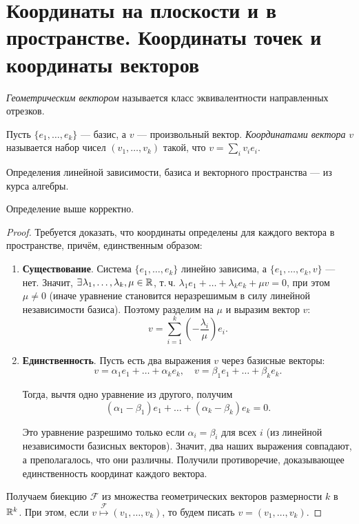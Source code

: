 \section{Координаты на плоскости и в пространстве. Координаты точек и координаты векторов}

\begin{definition}
    \textit{Геометрическим вектором} называется класс эквивалентности направленных отрезков.
\end{definition}

\begin{definition}
    Пусть $\{e_1, \ldots, e_k\}$ --- базис, а $v$ --- произвольный вектор. \textit{Координатами вектора} $v$ называется набор чисел $(v_1, \ldots, v_k)$ такой, что $v = \sum_iv_ie_i$.
\end{definition}

Определения линейной зависимости, базиса и векторного пространства --- из курса алгебры.

\begin{statement}
    Определение выше корректно.
\end{statement}

\begin{proof}
    Требуется доказать, что координаты определены для каждого вектора в пространстве, причём, единственным образом:
    \begin{enumerate}
        \item \textbf{Существование}. Система $\{e_1, \ldots, e_k\}$ линейно зависима, а $\{e_1, \ldots, e_k, v\}$ --- нет. Значит, $\exists\!\:\lambda_1, \ldots, \lambda_k, \mu \in \mathbb{R}$, т.\,ч. $\lambda_1e_1 + \ldots + \lambda_ke_k + \mu v = 0$, при этом $\mu \ne 0$ (иначе уравнение становится неразрешимым в силу линейной независимости базиса). Поэтому разделим на $\mu$ и выразим вектор $v$:
            $$v = \sum_{i = 1}^k\left(-\frac{\lambda_i}{\mu}\right)e_i.$$
        \item \textbf{Единственность}. Пусть есть два выражения $v$ через базисные векторы:
            $$
                v = \alpha_1e_1 + \ldots + \alpha_ke_k,\quad v = \beta_1e_1 + \ldots + \beta_ke_k.
            $$

            Тогда, вычтя одно уравнение из другого, получим
            $$(\alpha_1 - \beta_1)e_1 + \ldots + (\alpha_k - \beta_k)e_k = 0.$$

            Это уравнение разрешимо только если $\alpha_i = \beta_i$ для всех $i$ (из линейной независимости базисных векторов). Значит, два наших выражения совпадают, а преполагалось, что они различны. Получили противоречие, доказывающее единственность координат каждого вектора.
    \end{enumerate}

    Получаем биекцию $\mathcal{F}$ из множества геометрических векторов размерности $k$ в $\mathbb{R}^k$. При этом, если $v \overset{\mathcal{F}}{\mapsto} (v_1, \ldots, v_k)$, то будем писать $v = (v_1, \ldots, v_k)$.
\end{proof}

